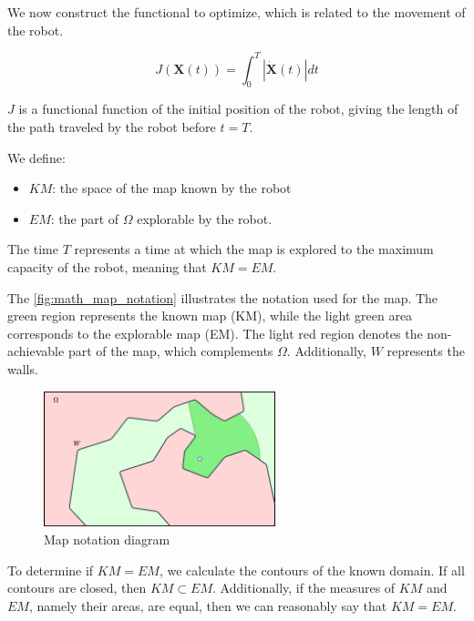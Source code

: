 \documentclass[../main.tex]{subfiles}
\begin{document}
We now construct the functional to optimize, which is related to the movement of the robot.
\vspace{0.5em}

\begin{equation}
	\displaystyle
	J(\mathbf{X}(t)) = \int_{0}^{T} | \mathbf{\dot{X}}(t) | dt
\end{equation}

\vspace{0.5em}

$J$ is a functional function of the initial position of the robot, giving the length of the path traveled by the robot before $t = T$.
\vspace{0.5em}

We define:
\begin{itemize}
	\item $\mathit{KM}$: the space of the map known by the robot
	\item $\mathit{EM}$: the part of $\Omega$ explorable by the robot.
\end{itemize}

The time $T$ represents a time at which the map is explored to the maximum capacity of the robot, meaning that $KM = EM$.

\vspace{0.5em}

The \autoref{fig:math_map_notation} illustrates the notation used for the map. The green region represents the known map (KM), while the light green area corresponds to the explorable map (EM). The light red region denotes the non-achievable part of the map, which complements $\Omega$. Additionally, $W$ represents the walls.
\begin{figure}[H]
	\centering
	\includegraphics[width=0.6\textwidth]{IMAGES/part3/math_map_nota.png}
	\caption{Map notation diagram}
	\label{fig:math_map_notation}
\end{figure}

\vspace{0.5em}

To determine if $KM = EM$, we calculate the contours of the known domain. If all contours are closed, then $KM \subset EM$. Additionally, if the measures of $KM$ and $EM$, namely their areas, are equal, then we can reasonably say that $KM = EM$.
\end{document}
